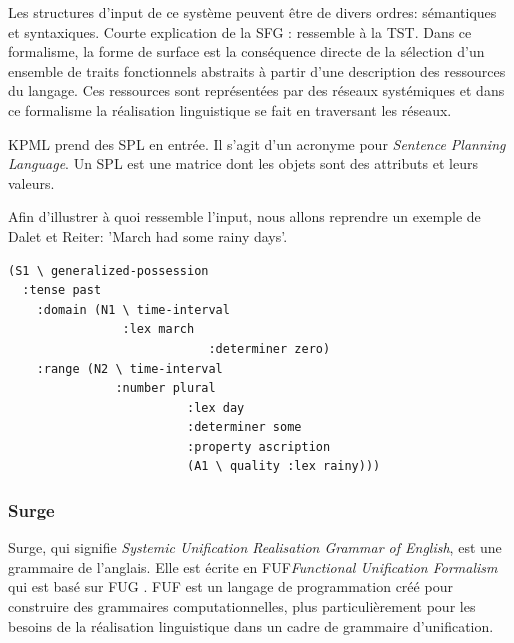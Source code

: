 
Les structures d'input de ce système peuvent être de divers ordres: sémantiques et syntaxiques. Courte explication de la SFG : ressemble à la TST. Dans ce formalisme, la forme de surface est la conséquence directe de la sélection d'un ensemble de traits fonctionnels abstraits à partir d'une description des ressources du langage. Ces ressources sont représentées par des réseaux systémiques et dans ce formalisme la réalisation linguistique se fait en traversant les réseaux.

KPML prend des SPL en entrée. Il s'agit d'un acronyme pour \emph{Sentence Planning Language}. Un SPL est une matrice dont les objets sont des attributs et leurs valeurs.

Afin d'illustrer à quoi ressemble l'input, nous allons reprendre un exemple de Dalet et Reiter: 'March had some rainy days'.
\begin{lstlisting}[language=Xml, caption=SPL: input de KPML, label=kpml]
(S1 \ generalized-possession
  :tense past 
	:domain (N1 \ time-interval
	            :lex march
							:determiner zero)
	:range (N2 \ time-interval
	           :number plural
						 :lex day
						 :determiner some
						 :property ascription
						 (A1 \ quality :lex rainy)))
\end{lstlisting}

\subsubsection{Surge}
\citep{Elhadad98surge:a}
Surge, qui signifie \emph{Systemic Unification Realisation Grammar of English}, est une grammaire de l'anglais. Elle est écrite en FUF\emph{Functional Unification Formalism} qui est basé sur FUG \citep{KayFunctionalUnificationGrammar1984}. FUF est un langage de programmation créé pour construire des grammaires computationnelles, plus particulièrement pour les besoins de la réalisation linguistique dans un cadre de grammaire d'unification. 

